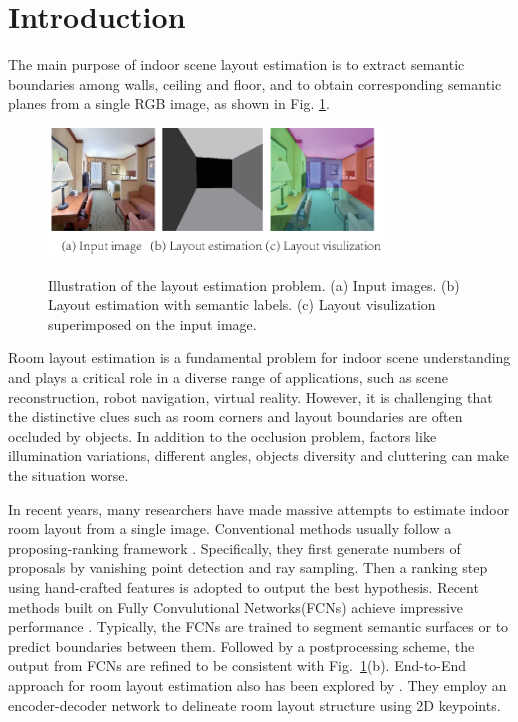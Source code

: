 \section{Introduction}
\label{sec:intro}

The main purpose of indoor scene layout estimation is to extract semantic boundaries among walls, ceiling and floor, and to obtain corresponding semantic planes from a single RGB image, as shown in Fig. \ref{fig:definition}. 


\begin{figure}[!ht]
	\centering
	\textsc{\includegraphics[width=3.5in]{figure/definition.eps}}
	\caption{Illustration of the layout estimation problem. (a) Input images. (b) Layout estimation with semantic labels. (c) Layout visulization superimposed on the input image.}
	\label{fig:definition}
\end{figure}


Room layout estimation is a fundamental problem for indoor scene understanding and plays a critical role in a diverse range of applications, such as scene reconstruction, robot navigation, virtual reality. However, it is challenging that the distinctive clues such as room corners and layout boundaries are often occluded by objects. In addition to the occlusion problem, factors like illumination variations, different angles, objects diversity and cluttering can make the situation worse.


In recent years, many researchers have made massive attempts to estimate indoor room layout from a single image. Conventional methods usually follow a proposing-ranking framework \cite{hedau2009recovering,wang2013discriminative,gupta2010estimating,hedau2010thinking}. Specifically, they first generate numbers of proposals by vanishing point detection and ray sampling. Then a ranking step using hand-crafted features is adopted to output the best hypothesis. Recent methods built on Fully Convulutional Networks(FCNs) achieve impressive performance \cite{mallya2015learning,ren2016coarse,zhang2016learning,dasgupta2016delay,zhao2017physics}. Typically, the FCNs are trained to segment semantic surfaces or to predict boundaries between them. Followed by a postprocessing scheme, the output from FCNs are refined to be consistent with Fig.~\ref{fig:definition}(b). End-to-End approach for room layout estimation also has been explored by \cite{LeeRoomNet17}. They employ an encoder-decoder network to delineate room layout structure using
2D keypoints. 

